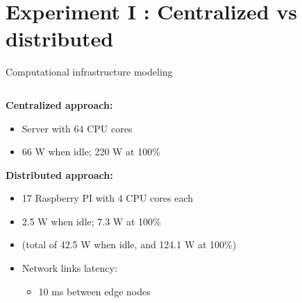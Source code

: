 \documentclass[Ligatures=TeX,table,svgnames,usetotalslideindicator,compress,10pt,aspectratio=169]{beamer}
\begin{document}
  \section{Experiment I : Centralized vs distributed}
\begin{frame}{Computational infrastructure modeling}


\begin{columns}        
\begin{column}{0.5\textwidth}



\textbf{Centralized approach:}
  \begin{itemize}    
  \item  Server with 64 CPU cores
  \item 66 W when idle; 220 W at 100\% %
  \end{itemize}    
  \textbf{Distributed approach:} 
  \begin{itemize}    
  \item 17 Raspberry PI with 4 CPU cores each
  \item 2.5 W when idle; 7.3 W at 100\% 
  \item (total of 42.5 W when idle, and 124.1 W at 100\%)
  \item Network links latency:
  \begin{itemize}
      \item 10 ms between edge nodes
  \end{itemize}
  \end{itemize}

 
  \end{column}
  \begin{column}{0.5\textwidth}


\end{column}
\end{columns}
\end{frame}
\end{document}
